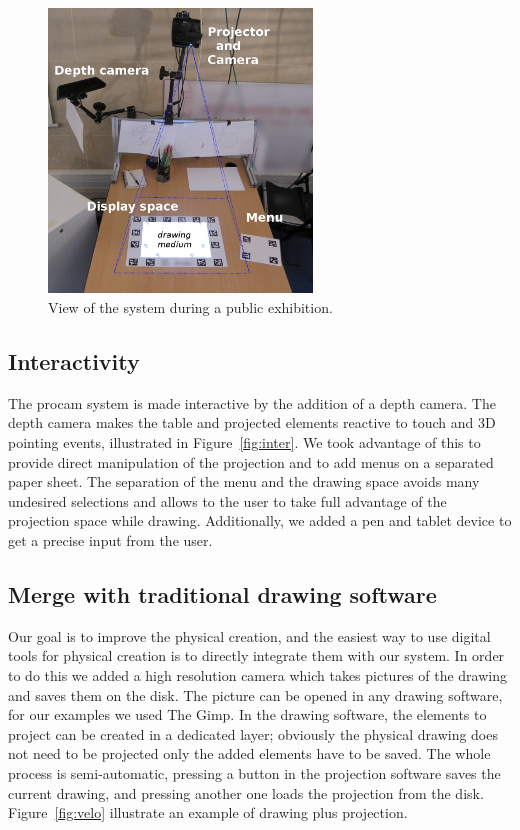 \documentclass{article}
\begin{document}
\begin{figure}[!b]
\centering \includegraphics[width = 70mm]{global}
\caption{View of the system during a public exhibition.} 
\label{fig:system}
\end{figure}

\subsection{Interactivity}

The procam system is made interactive by the addition of a depth camera. The depth camera makes the table and projected elements reactive to touch and 3D pointing events, illustrated in Figure~\ref{fig:inter}. We took advantage of this to provide direct manipulation of the projection and to add menus on a separated paper sheet. The separation of the menu and the drawing space avoids many undesired selections and allows to the user to take full advantage of the projection space while drawing. Additionally, we added a pen and tablet device to get a precise input from the user. 

\subsection{Merge with traditional drawing software}
Our goal is to improve the physical creation, and the easiest way to use digital tools for physical creation is to directly integrate them with our system. In order to do this we added a high resolution camera which takes pictures of the drawing and saves them on the disk. The picture can be opened in any drawing software, for our examples we used The Gimp. In the drawing software, the elements to project can be created in a dedicated layer; obviously the physical drawing does not need to be projected only the added elements have to be saved. The whole process is semi-automatic, pressing a button in the projection software saves the current drawing, and pressing another one loads the projection from the disk. Figure~\ref{fig:velo} illustrate an example of drawing plus projection.
\end{document}
